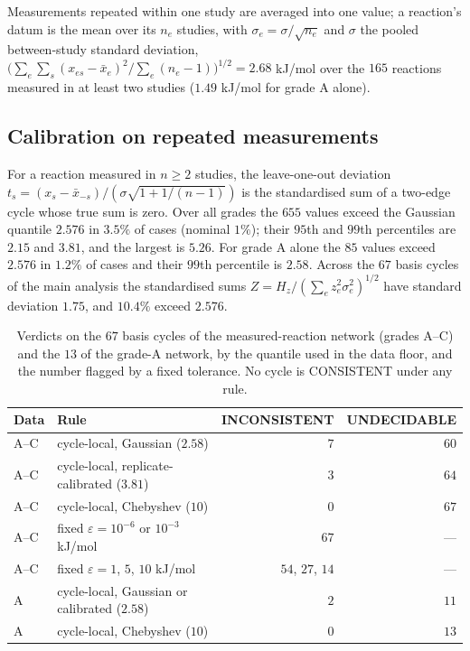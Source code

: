 \documentclass[11pt,a4paper]{article}
\theoremstyle{definition}
\theoremstyle{remark}
\newcommand{\eps}{\varepsilon}
\newcommand{\hol}{H}
\begin{document}
Measurements repeated within one study are averaged into one value; a
reaction's datum is the mean over its $n_e$ studies, with
$\sigma_e=\sigma/\sqrt{n_e}$ and $\sigma$ the pooled between-study
standard deviation, $\bigl(\sum_e\sum_s(x_{es}-\bar x_e)^2/
\sum_e(n_e-1)\bigr)^{1/2}=2.68$ kJ/mol over the $165$ reactions
measured in at least two studies ($1.49$ kJ/mol for grade A alone).

\subsection*{Calibration on repeated measurements}

For a reaction measured in $n\ge2$ studies, the leave-one-out deviation
$t_s=(x_s-\bar x_{-s})/(\sigma\sqrt{1+1/(n-1)})$ is the standardised
sum of a two-edge cycle whose true sum is zero. Over all grades the
$655$ values exceed the Gaussian quantile $2.576$ in $3.5\%$ of cases
(nominal $1\%$); their $95$th and $99$th percentiles are $2.15$ and
$3.81$, and the largest is $5.26$. For grade A alone the $85$ values
exceed $2.576$ in $1.2\%$ of cases and their $99$th percentile is
$2.58$. Across the $67$ basis cycles of the main analysis the
standardised sums $Z=\hol_z/(\sum_e z_e^2\sigma_e^2)^{1/2}$ have
standard deviation $1.75$, and $10.4\%$ exceed $2.576$.

\begin{table}[h]
\centering\small
\caption{Verdicts on the $67$ basis cycles of the measured-reaction
network (grades A--C) and the $13$ of the grade-A network, by the
quantile used in the data floor, and the number flagged by a fixed
tolerance. No cycle is \textsf{CONSISTENT} under any rule.}
\label{tab:s-real}
\begin{tabular}{@{}llrr@{}}
\toprule
Data & Rule & \textsf{INCONSISTENT} & \textsf{UNDECIDABLE}\\
\midrule
A--C & cycle-local, Gaussian ($2.58$) & $7$ & $60$\\
A--C & cycle-local, replicate-calibrated ($3.81$) & $3$ & $64$\\
A--C & cycle-local, Chebyshev ($10$) & $0$ & $67$\\
A--C & fixed $\eps=10^{-6}$ or $10^{-3}$ kJ/mol & $67$ & ---\\
A--C & fixed $\eps=1$, $5$, $10$ kJ/mol & $54$, $27$, $14$ & ---\\
A    & cycle-local, Gaussian or calibrated ($2.58$) & $2$ & $11$\\
A    & cycle-local, Chebyshev ($10$) & $0$ & $13$\\
\bottomrule
\end{tabular}
\end{table}
\end{document}
